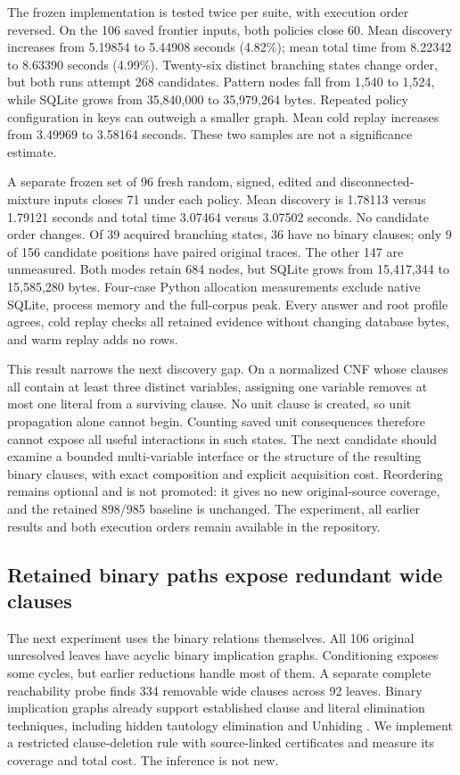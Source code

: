 \documentclass[11pt,a4paper]{article}
\numberwithin{equation}{section}
\theoremstyle{plain}
\theoremstyle{definition}
\theoremstyle{remark}
\begin{document}
The frozen implementation is tested twice per suite, with execution order reversed. On the 106 saved frontier inputs, both policies close 60. Mean discovery increases from 5.19854 to 5.44908 seconds (4.82\%); mean total time from 8.22342 to 8.63390 seconds (4.99\%). Twenty-six distinct branching states change order, but both runs attempt 268 candidates. Pattern nodes fall from 1,540 to 1,524, while SQLite grows from 35,840,000 to 35,979,264 bytes. Repeated policy configuration in keys can outweigh a smaller graph. Mean cold replay increases from 3.49969 to 3.58164 seconds. These two samples are not a significance estimate.

A separate frozen set of 96 fresh random, signed, edited and disconnected-mixture inputs closes 71 under each policy. Mean discovery is 1.78113 versus 1.79121 seconds and total time 3.07464 versus 3.07502 seconds. No candidate order changes. Of 39 acquired branching states, 36 have no binary clauses; only 9 of 156 candidate positions have paired original traces. The other 147 are unmeasured. Both modes retain 684 nodes, but SQLite grows from 15,417,344 to 15,585,280 bytes. Four-case Python allocation measurements exclude native SQLite, process memory and the full-corpus peak. Every answer and root profile agrees, cold replay checks all retained evidence without changing database bytes, and warm replay adds no rows.

This result narrows the next discovery gap. On a normalized CNF whose clauses all contain at least three distinct variables, assigning one variable removes at most one literal from a surviving clause. No unit clause is created, so unit propagation alone cannot begin. Counting saved unit consequences therefore cannot expose all useful interactions in such states. The next candidate should examine a bounded multi-variable interface or the structure of the resulting binary clauses, with exact composition and explicit acquisition cost. Reordering remains optional and is not promoted: it gives no new original-source coverage, and the retained 898/985 baseline is unchanged. The experiment, all earlier results and both execution orders remain available in the repository.


\subsection{Retained binary paths expose redundant wide clauses}
\label{sec:binary-paths}

The next experiment uses the binary relations themselves. All 106 original unresolved leaves have acyclic binary implication graphs. Conditioning exposes some cycles, but earlier reductions handle most of them. A separate complete reachability probe finds 334 removable wide clauses across 92 leaves. Binary implication graphs already support established clause and literal elimination techniques, including hidden tautology elimination and Unhiding \citep{heule2010elimination,heule2011unhiding}. We implement a restricted clause-deletion rule with source-linked certificates and measure its coverage and total cost. The inference is not new.
\end{document}

